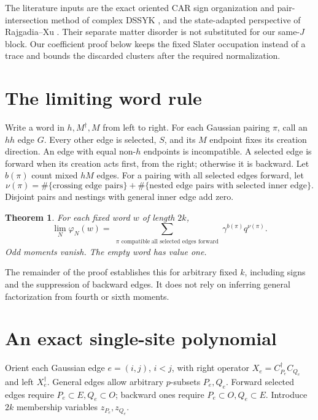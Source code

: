 \documentclass[11pt]{article}
\newcommand{\ph}{\varphi}
\newtheorem{theorem}{Theorem}
\begin{document}
The literature inputs are the exact oriented CAR sign organization
and pair-intersection method of complex DSSYK
\cite[Sec.~3.2--3.3]{BNR}, and the state-adapted perspective of
Rajgadia--Xu \cite{RX}. Their separate matter disorder is not
substituted for our same-$J$ block. Our coefficient proof below
keeps the fixed Slater occupation instead of a trace and bounds
the discarded clusters after the required normalization.

\section{The limiting word rule}
Write a word in $h,M^\dagger,M$ from left to right. For each
Gaussian pairing $\pi$, call an $hh$ edge $G$. Every other edge
is selected, $S$, and its $M$ endpoint fixes its creation direction.
An edge with equal non-$h$ endpoints is incompatible. A selected
edge is forward when its creation acts first, from the right;
otherwise it is backward. Let $b(\pi)$ count mixed $hM$ edges.
For a pairing with all selected edges forward, let
\begin{equation}\label{nu}
 \nu(\pi)=\#\{\text{crossing edge pairs}\}
 +\#\{\text{nested edge pairs with selected inner edge}\}.
\end{equation}
Disjoint pairs and nestings with general inner edge add zero.

\begin{theorem}\label{words}
For each fixed word $w$ of length $2k$,
\begin{equation}\label{law}
 \lim_N\ph_N(w)=
 \sum_{\substack{\pi\text{ compatible}\
                   \text{all selected edges forward}}}
       \gamma^{b(\pi)}q^{\nu(\pi)}.
\end{equation}
Odd moments vanish. The empty word has value one.
\end{theorem}
The remainder of the proof establishes this for arbitrary fixed
$k$, including signs and the suppression of backward edges.
It does not rely on inferring general factorization from fourth
or sixth moments.

\newpage
\section{An exact single-site polynomial}
Orient each Gaussian edge $e=(i,j)$, $i<j$, with right operator
$X_e=C_{P_e}^\dagger C_{Q_e}$ and left $X_e^\dagger$.
General edges allow arbitrary $p$-subsets $P_e,Q_e$. Forward
selected edges require $P_e\subset E,Q_e\subset O$; backward
ones require $P_e\subset O,Q_e\subset E$.
Introduce $2k$ membership variables $z_{P_e},z_{Q_e}$.
\end{document}

